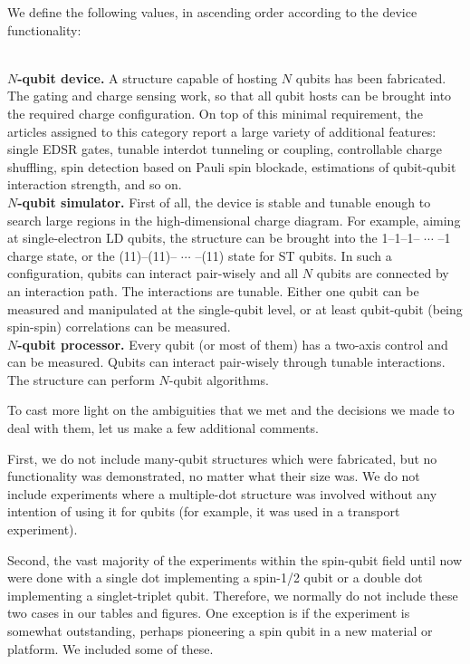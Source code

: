 \documentclass[aps, prx, showpacs, twocolumn, superscriptaddress, notitlepage, longbibliography, floatfix, nofootinbib]{revtex4-2}
\newcommand{\separate}[1]
{
 #1
}
\begin{document}
We define the following values, in ascending order according to the device functionality:
\separate{
\textbf{\\$N$-qubit device.} A structure capable of hosting $N$ qubits has been fabricated. The gating and charge sensing work, so that all qubit hosts can be brought into the required charge configuration. On top of this minimal requirement, the articles assigned to this category report a large variety of additional features: single EDSR gates, tunable interdot tunneling or coupling, controllable charge shuffling, spin detection based on Pauli spin blockade, estimations of qubit-qubit interaction strength, and so on. 
\textbf{\\$N$-qubit simulator.} First of all, the device is stable and tunable enough to search large regions in the high-dimensional charge diagram. For example, aiming at single-electron LD qubits, the structure can be brought into the 1--1--1-- $\cdots$ --1 charge state, or the (11)--(11)-- $\cdots$ --(11) state for ST qubits. In such a configuration, qubits can interact pair-wisely and all $N$ qubits are connected by an interaction path. The interactions are tunable. Either one qubit can be measured and manipulated at the single-qubit level, or at least qubit-qubit (being spin-spin) correlations can be measured.
\textbf{\\$N$-qubit processor.} Every qubit (or most of them) has a two-axis control and can be measured. Qubits can interact pair-wisely through tunable interactions. The structure can perform $N$-qubit algorithms. 
}


To cast more light on the ambiguities that we met and the decisions we made to deal with them, let us make a few additional comments.

First, we do not include many-qubit structures which were fabricated, but no functionality was demonstrated, no matter what their size was. We do not include experiments where a multiple-dot structure was involved without any intention of using it for qubits (for example, it was used in a transport experiment).

Second, the vast majority of the experiments within the spin-qubit field until now were done with a single dot implementing a spin-1/2 qubit or a double dot implementing a singlet-triplet qubit. Therefore, we normally do not include these two cases in our tables and figures. One exception is if the experiment is somewhat outstanding, perhaps pioneering a spin qubit in a new material or platform. We included some of these. 
\end{document}

